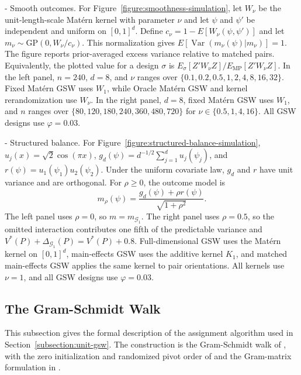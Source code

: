 \documentclass[letterpaper,12pt]{article}
\makeatletter
\theoremstyle{definition}
\numberwithin{equation}{section}
\newcommand{\mc}{\mathcal}
\newcommand{\E}{E}
\DeclareMathOperator{\var}{Var}
\renewcommand{\paragraph}{\@startsection{paragraph}{4}{\z@}%
  {\medskipamount}%
  {-\fontdimen2\font}%
  {\normalfont\normalsize\bfseries}}
\makeatother
\begin{document}
\paragraph{Smooth outcomes.}
For Figure~\ref{figure:smoothness-simulation}, let $W_\nu$ be the unit-length-scale Mat\'ern kernel with parameter $\nu$ and let $\psi$ and $\psi'$ be independent and uniform on $[0,1]^d$.
Define $c_\nu=1-\E[W_\nu(\psi,\psi')]$ and let $m_\nu\sim\mathrm{GP}(0,W_\nu/c_\nu)$.
This normalization gives $\E[\var(m_\nu(\psi)|m_\nu)]=1$.
The figure reports prior-averaged excess variance relative to matched pairs.
Equivalently, the plotted value for a design $\sigma$ is $\E_\sigma[Z'W_\nu Z]/\E_{\mathrm{MP}}[Z'W_\nu Z]$.
In the left panel, $n=240$, $d=8$, and $\nu$ ranges over $\{0.1,0.2,0.5,1,2,4,8,16,32\}$.
Fixed Mat\'ern GSW uses $W_1$, while Oracle Mat\'ern GSW and kernel rerandomization use $W_\nu$.
In the right panel, $d=8$, fixed Mat\'ern GSW uses $W_1$, and $n$ ranges over $\{80,120,180,240,360,480,720\}$ for $\nu\in\{0.5,1,4,16\}$.
All GSW designs use $\varphi=0.03$.

\paragraph{Structured balance.}
For Figure~\ref{figure:structured-balance-simulation}, $u_j(x)=\sqrt{2}\cos(\pi x)$, $g_d(\psi)=d^{-1/2}\sum_{j=1}^du_j(\psi_j)$, and $r(\psi)=u_1(\psi_1)u_2(\psi_2)$.
Under the uniform covariate law, $g_d$ and $r$ have unit variance and are orthogonal.
For $\rho\geq0$, the outcome model is
\begin{equation}\label{equation:simulation-structured-model}
m_\rho(\psi)=\frac{g_d(\psi)+\rho r(\psi)}{\sqrt{1+\rho^2}}.
\end{equation}
The left panel uses $\rho=0$, so $m=m_{\mc G_1}$.
The right panel uses $\rho=0.5$, so the omitted interaction contributes one fifth of the predictable variance and $V^*(P)+\Delta_{\mc G_1}(P)=V^*(P)+0.8$.
Full-dimensional GSW uses the Mat\'ern kernel on $[0,1]^d$, main-effects GSW uses the additive kernel $K_1$, and matched main-effects GSW applies the same kernel to pair orientations.
All kernels use $\nu=1$, and all GSW designs use $\varphi=0.03$.

\subsection{The Gram-Schmidt Walk}\label{appendix:gsw}

This subsection gives the formal description of the assignment algorithm used in Section~\ref{subsection:unit-gsw}.
The construction is the Gram-Schmidt walk of \citet{bansal2019gram}, with the zero initialization and randomized pivot order of \citet{harshaw2024gsw} and the Gram-matrix formulation in \citet[Section 2.7]{harshaw2021dissertation}.
\end{document}
